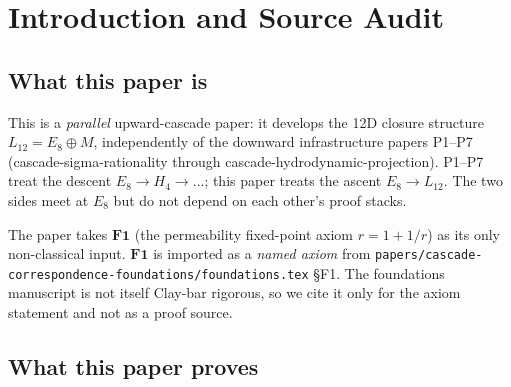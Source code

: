 \documentclass[11pt, a4paper]{amsart}
\theoremstyle{definition}
\newcommand{\Q}{\mathbb{Q}}
\begin{document}
\begin{abstract}
$\mathbf{F1}$ is used \emph{only} as a named axiom imported
from
\texttt{papers/cascade-correspondence-foundations/foundations.tex}
\S F1; the foundations manuscript is cited solely for the
axiom statement and \emph{not} as a theorem-grade proof
source. No dependence on the infrastructure papers P1--P7; no
claim about $\alpha$, photons, microtubules, spacetime, or
dynamics is made or implied. Classical inputs
(ring of integers of $\Q(\sqrt{5})$, PID / free-module
structure theorem, Elser--Sloane icosian construction of
$E_8$, Conway--Sloane / Moody--Patera cut-and-project
framework) are cited directly to the classical literature.

This paper is the first entry of the $\alpha$-chain: $\alpha$-2
will treat the phason--Coxeter alignment (A, B); $\alpha$-3 will
assemble $\alpha^{-1} = 137 + \pi/87$. Neither downstream result
is stated or used here.
\end{abstract}

\tableofcontents

\section{Introduction and Source Audit}
\label{sec:intro}

\subsection{What this paper is}

This is a \emph{parallel} upward-cascade paper: it develops the
12D closure structure $L_{12} = E_8 \oplus M$, independently of
the downward infrastructure papers P1--P7
(cascade-sigma-rationality through cascade-hydrodynamic-projection).
P1--P7 treat the descent $E_8 \to H_4 \to \ldots$; this paper
treats the ascent $E_8 \to L_{12}$. The two sides meet at $E_8$
but do not depend on each other's proof stacks.

The paper takes $\mathbf{F1}$ (the permeability fixed-point axiom
$r = 1 + 1/r$) as its only non-classical input. $\mathbf{F1}$ is
imported as a \emph{named axiom} from
\texttt{papers/cascade-correspondence-foundations/foundations.tex}
\S F1. The foundations manuscript is not itself Clay-bar
rigorous, so we cite it only for the axiom statement and not as
a proof source.

\subsection{What this paper proves}
\end{document}
